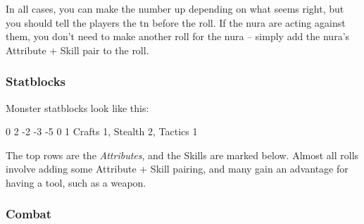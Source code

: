 \begin{multicols}{2}
{  In all cases, you can make the number up depending on what seems right, but you should tell the players the \gls{tn} before the roll.
  If the nura are acting against them, you don't need to make another roll for the nura -- simply add the nura's Attribute + Skill pair to the roll.

  \subsubsection{Statblocks}
  Monster statblocks look like this:

  {0}%
  {2}%
  {{-2}%
  {-3}%
  {-5}}%
  {0}%
  {1}%
  {Crafts 1, Stealth 2, Tactics 1}%
  {\Dagger}%
  {}

  The top rows are the \textit{Attributes}, and the Skills are marked below.
  Almost all rolls involve adding some Attribute + Skill pairing, and many gain an advantage for having a tool, such as a weapon.

  \subsubsection{Combat}

  \begin{itemize}


\end{itemize}}
\end{multicols}

